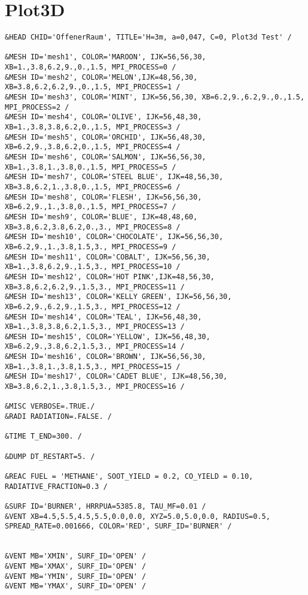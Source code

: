 \section{Plot3D}
\begin{lstlisting}[emptylines=0,basicstyle=\tiny]
&HEAD CHID='OffenerRaum', TITLE='H=3m, a=0,047, C=0, Plot3d Test' /

&MESH ID='mesh1', COLOR='MAROON', IJK=56,56,30, XB=1.,3.8,6.2,9.,0.,1.5, MPI_PROCESS=0 /
&MESH ID='mesh2', COLOR='MELON',IJK=48,56,30, XB=3.8,6.2,6.2,9.,0.,1.5, MPI_PROCESS=1 /
&MESH ID='mesh3', COLOR='MINT', IJK=56,56,30, XB=6.2,9.,6.2,9.,0.,1.5, MPI_PROCESS=2 /
&MESH ID='mesh4', COLOR='OLIVE', IJK=56,48,30, XB=1.,3.8,3.8,6.2,0.,1.5, MPI_PROCESS=3 /
&MESH ID='mesh5', COLOR='ORCHID', IJK=56,48,30, XB=6.2,9.,3.8,6.2,0.,1.5, MPI_PROCESS=4 /
&MESH ID='mesh6', COLOR='SALMON', IJK=56,56,30, XB=1.,3.8,1.,3.8,0.,1.5, MPI_PROCESS=5 /
&MESH ID='mesh7', COLOR='STEEL BLUE', IJK=48,56,30, XB=3.8,6.2,1.,3.8,0.,1.5, MPI_PROCESS=6 /
&MESH ID='mesh8', COLOR='FLESH', IJK=56,56,30, XB=6.2,9.,1.,3.8,0.,1.5, MPI_PROCESS=7 /
&MESH ID='mesh9', COLOR='BLUE', IJK=48,48,60, XB=3.8,6.2,3.8,6.2,0.,3., MPI_PROCESS=8 /
&MESH ID='mesh10', COLOR='CHOCOLATE', IJK=56,56,30, XB=6.2,9.,1.,3.8,1.5,3., MPI_PROCESS=9 /
&MESH ID='mesh11', COLOR='COBALT', IJK=56,56,30, XB=1.,3.8,6.2,9.,1.5,3., MPI_PROCESS=10 /
&MESH ID='mesh12', COLOR='HOT PINK',IJK=48,56,30, XB=3.8,6.2,6.2,9.,1.5,3., MPI_PROCESS=11 /
&MESH ID='mesh13', COLOR='KELLY GREEN', IJK=56,56,30, XB=6.2,9.,6.2,9.,1.5,3., MPI_PROCESS=12 /
&MESH ID='mesh14', COLOR='TEAL', IJK=56,48,30, XB=1.,3.8,3.8,6.2,1.5,3., MPI_PROCESS=13 /
&MESH ID='mesh15', COLOR='YELLOW', IJK=56,48,30, XB=6.2,9.,3.8,6.2,1.5,3., MPI_PROCESS=14 /
&MESH ID='mesh16', COLOR='BROWN', IJK=56,56,30, XB=1.,3.8,1.,3.8,1.5,3., MPI_PROCESS=15 /
&MESH ID='mesh17', COLOR='CADET BLUE', IJK=48,56,30, XB=3.8,6.2,1.,3.8,1.5,3., MPI_PROCESS=16 /

&MISC VERBOSE=.TRUE./
&RADI RADIATION=.FALSE. /

&TIME T_END=300. /

&DUMP DT_RESTART=5. /

&REAC FUEL = 'METHANE', SOOT_YIELD = 0.2, CO_YIELD = 0.10, RADIATIVE_FRACTION=0.3 /

&SURF ID='BURNER', HRRPUA=5385.8, TAU_MF=0.01 /
&VENT XB=4.5,5.5,4.5,5.5,0.0,0.0, XYZ=5.0,5.0,0.0, RADIUS=0.5, SPREAD_RATE=0.001666, COLOR='RED', SURF_ID='BURNER' /


&VENT MB='XMIN', SURF_ID='OPEN' /  
&VENT MB='XMAX', SURF_ID='OPEN' /  
&VENT MB='YMIN', SURF_ID='OPEN' /  
&VENT MB='YMAX', SURF_ID='OPEN' / 
 

\end{lstlisting}
